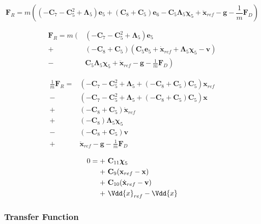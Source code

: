 \[
\mathbf{F}_{R}
= m \left(
	\left( -\mathbf{C}_7 - \mathbf{C}_5^2 + \boldsymbol\Lambda_5\right) \mathbf{e}_5 +
	\left( \mathbf{C}_8 + \mathbf{C}_5 \right) \mathbf{e}_6 
	- \mathbf{C}_5 \boldsymbol\Lambda_5 \boldsymbol\chi_5
	+ \ddot{\mathbf{x}}_{ref}
	- \mathbf{g}
	- \frac{1}{m} \mathbf{F}_{D}
\right)
\]

\begin{align}\nonumber
\mathbf{F}_{R}
= m \left( \right. & \left( -\mathbf{C}_7 - \mathbf{C}_5^2 + \boldsymbol\Lambda_5 \right) \mathbf{e}_5 \\\nonumber
	+ &\left( -\mathbf{C}_8 + \mathbf{C}_5 \right) \left( \mathbf{C}_5 \mathbf{e}_5 + \dot{\mathbf{x}}_{ref} + \boldsymbol\Lambda_5 \boldsymbol\chi_5 - \mathbf{v}\right) \\\nonumber
	- &\left. \mathbf{C}_5 \boldsymbol\Lambda_5 \boldsymbol\chi_5
	+ \ddot{\mathbf{x}}_{ref}
	- \mathbf{g}
	- \frac{1}{m} \mathbf{F}_{D}
\right)
\end{align}

\begin{align}\nonumber
\frac{1}{m} \mathbf{F}_{R}
= & \left( -\mathbf{C}_7 - \mathbf{C}_5^2 + \boldsymbol\Lambda_5 + \left( -\mathbf{C}_8 + \mathbf{C}_5 \right) \mathbf{C}_5 \right) \mathbf{x}_{ref} \\\nonumber
- &\left( -\mathbf{C}_7 - \mathbf{C}_5^2 + \boldsymbol\Lambda_5 + \left( -\mathbf{C}_8 + \mathbf{C}_5 \right) \mathbf{C}_5 \right) \mathbf{x} \\\nonumber
+ &\left( -\mathbf{C}_8 + \mathbf{C}_5 \right) \dot{\mathbf{x}}_{ref} \\\nonumber
+ &\left( -\mathbf{C}_8 \right) \boldsymbol\Lambda_5 \boldsymbol\chi_5 \\\nonumber
- &\left( -\mathbf{C}_8 + \mathbf{C}_5 \right) \mathbf{v} \\\nonumber
+ &\ddot{\mathbf{x}}_{ref} - \mathbf{g} - \frac{1}{m} \mathbf{F}_{D}
\end{align}

\begin{align}\nonumber
0 = + &~ \mathbf{C}_{11} \boldsymbol\chi_5 \\\nonumber
+ &~ \mathbf{C}_9 (\mathbf{x}_{ref} - \mathbf{x}) \\\nonumber
+ &~ \mathbf{C}_{10} (\dot{\mathbf{x}}_{ref} - \mathbf{v}) \\\nonumber
+ &~ \Vdd{x}_{ref} - \Vdd{x}
\end{align}

\subsubsection{Transfer Function}

